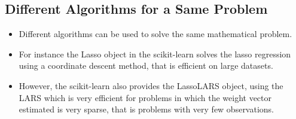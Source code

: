 \subsection{Different Algorithms for a Same Problem}
\begin{itemize}
\item Different algorithms can be used to solve the same mathematical problem. 
\item For instance the Lasso object in the scikit-learn solves the lasso regression using a coordinate descent method, that is efficient on large datasets. 
\item However, the scikit-learn also provides the LassoLARS object, using the LARS which is very efficient for problems in which the weight vector estimated is very sparse, that is problems with very few observations.
\end{itemize}




